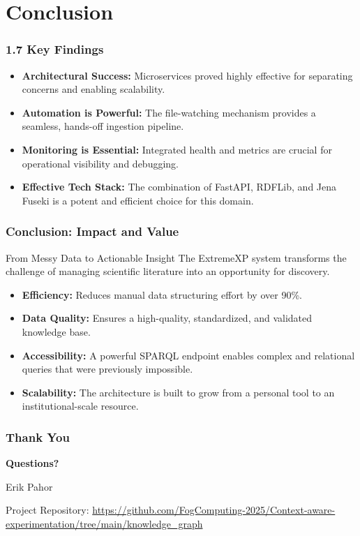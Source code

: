 \documentclass{beamer}
\begin{document}
\section{Conclusion}

\begin{frame}
    \frametitle{1.7 Key Findings}
    
    \begin{itemize}
        \item<1-> \textbf{Architectural Success:} Microservices proved highly effective for separating concerns and enabling scalability.
        \pause
        \item<2-> \textbf{Automation is Powerful:} The file-watching mechanism provides a seamless, hands-off ingestion pipeline.
        \pause
        \item<3-> \textbf{Monitoring is Essential:} Integrated health and metrics are crucial for operational visibility and debugging.
        \pause
        \item<4-> \textbf{Effective Tech Stack:} The combination of FastAPI, RDFLib, and Jena Fuseki is a potent and efficient choice for this domain.
    \end{itemize}
\end{frame}

\begin{frame}
    \frametitle{Conclusion: Impact and Value}
    
    \begin{block}{From Messy Data to Actionable Insight}
        The ExtremeXP system transforms the challenge of managing scientific literature into an opportunity for discovery.
    \end{block}
    
    \begin{itemize}
        \item \textbf{Efficiency:} Reduces manual data structuring effort by over 90\%.
        \pause
        \item \textbf{Data Quality:} Ensures a high-quality, standardized, and validated knowledge base.
        \pause
        \item \textbf{Accessibility:} A powerful SPARQL endpoint enables complex and relational queries that were previously impossible.
        \pause
        \item \textbf{Scalability:} The architecture is built to grow from a personal tool to an institutional-scale resource.
    \end{itemize}
\end{frame}

\begin{frame}
    \frametitle{Thank You}
    \begin{center}
        \Huge\bfseries Questions?
        
        \vspace{2cm}
        
        \large Erik Pahor
        
        \normalsize Project Repository: \url{https://github.com/FogComputing-2025/Context-aware-experimentation/tree/main/knowledge_graph}
    \end{center}
\end{frame}
\end{document}
